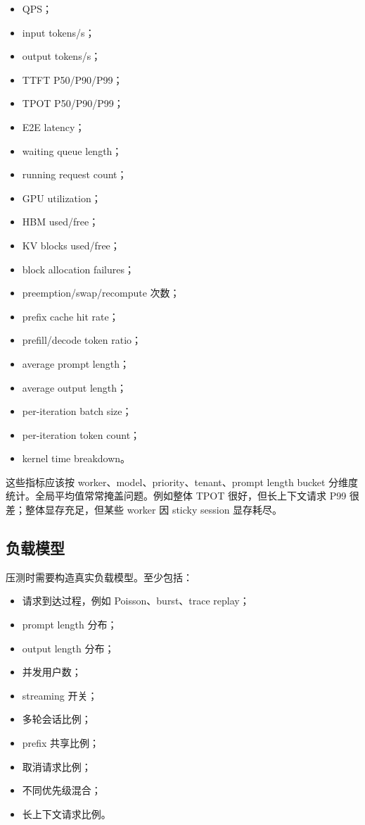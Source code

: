 \begin{itemize}
\item QPS；
\item input tokens/s；
\item output tokens/s；
\item TTFT P50/P90/P99；
\item TPOT P50/P90/P99；
\item E2E latency；
\item waiting queue length；
\item running request count；
\item GPU utilization；
\item HBM used/free；
\item KV blocks used/free；
\item block allocation failures；
\item preemption/swap/recompute 次数；
\item prefix cache hit rate；
\item prefill/decode token ratio；
\item average prompt length；
\item average output length；
\item per-iteration batch size；
\item per-iteration token count；
\item kernel time breakdown。
\end{itemize}

这些指标应该按 worker、model、priority、tenant、prompt length bucket 分维度统计。全局平均值常常掩盖问题。例如整体 TPOT 很好，但长上下文请求 P99 很差；整体显存充足，但某些 worker 因 sticky session 显存耗尽。

\subsection{负载模型}
\label{subsec:serving-load-model}

压测时需要构造真实负载模型。至少包括：

\begin{itemize}
\item 请求到达过程，例如 Poisson、burst、trace replay；
\item prompt length 分布；
\item output length 分布；
\item 并发用户数；
\item streaming 开关；
\item 多轮会话比例；
\item prefix 共享比例；
\item 取消请求比例；
\item 不同优先级混合；
\item 长上下文请求比例。
\end{itemize}

